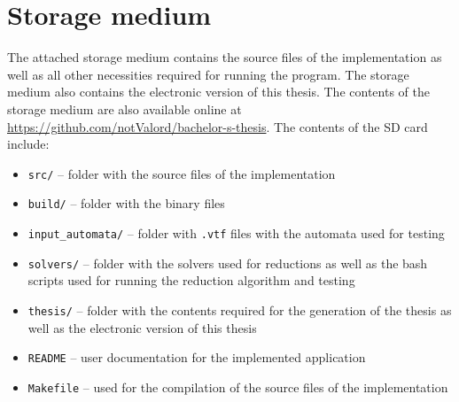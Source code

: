 
%

\chapter{Storage medium}
The attached storage medium contains the source files of the implementation as well as all other necessities required for running the program. The storage medium also contains the electronic version of this thesis. The contents of the storage medium are also available online at \url{https://github.com/notValord/bachelor-s-thesis}. The contents of the SD card include:
\begin{itemize}
    \item \texttt{src/}             -- folder with the source files of the implementation
    \item \texttt{build/}             -- folder with the binary files
    \item \texttt{input\_automata/}  -- folder with \texttt{.vtf} files with the automata used for testing
    \item \texttt{solvers/}          -- folder with the solvers used for reductions as well as the bash scripts used for running the reduction algorithm and testing
    \item \texttt{thesis/}          -- folder with the contents required for the generation of the thesis as well as the electronic version of this thesis
    \item \texttt{README}           -- user documentation for the implemented application
    \item \texttt{Makefile}         -- used for the compilation of the source files of the implementation
\end{itemize}







%
